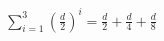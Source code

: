 \documentclass[preview]{standalone}
\begin{document}
\begin{align*}
\sum_{i=1}^{3} \left(\frac{d}{2}\right)^i =\frac{d}{2} + \frac{d}{4} + \frac{d}{8}
\end{align*}
\end{document}
